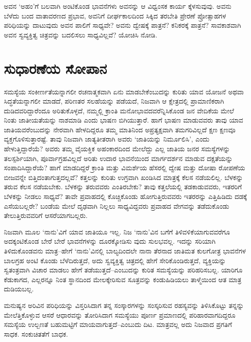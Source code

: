 ಅವನ ‘ಅಹಂ’ಗೆ ಬಲವಾಗಿ ಅಂಟಿಕೊಂಡ ಭಾವನೆಗಳು ಅವನನ್ನು ಆ ವಿಧ್ವಂಸಕ ಕಾರ್ಯ ಕ್ಕೆಳಸುವುವು. ಅವನು ಬೆಳೆದು ಬಂದ ವಾತಾವರಣದ ಪ್ರಭಾವ, ಅವನಿಗೆ ದೀರ್ಘಕಾಲದಿಂದ ಸಿಕ್ಕಿದ ತರಬೇತಿ ಪ್ರೇರಣೆ ಪ್ರೋತ್ಸಾಹಗಳ ಪರಿಧಿಯನ್ನು ದಾಟುವುದು ಅವನ ಪಾಲಿಗೆ ಸಾಧ್ಯವೇ? ಅವನು ದ್ವೇಷಕ್ಕೆ ಪಾತ್ರನೆ? ಕನಿಕರಕ್ಕೆ ಪಾತ್ರನೆ? ಸಾವಕಾಶವಾಗಿ ಅವನ ಸ್ವವ್ಯಕ್ತಿತ್ವ ಚಿತ್ರವನ್ನು ಬದಲಿಸಲು ಸಾಧ್ಯವಿಲ್ಲವೆ? ಯೋಚಿಸಿ ನೋಡಿ.


\section*{ಸುಧಾರಣೆಯ ಸೋಪಾನ}


ಸಮಸ್ಯೆಯ ಸಂಕೀರ್ಣತೆಯನ್ನಾಗಲೀ ರಚನಾತ್ಮಕವಾಗಿ ಏನು ಮಾಡಬೇಕೆಂಬುದನ್ನು ಕುರಿತು ಯಾವ ಯೋಜನೆ ಅಥವಾ ಸಿದ್ಧತೆಯನ್ನಾಗಲೀ ಮಾಡದೆ, ಪರಿಣತರ ಸಲಹೆಯನ್ನು ಪಡೆಯದೆ, ನಿಜವಾಗಿ ಆ ಕ್ಷೇತ್ರದಲ್ಲಿ ಪ್ರಾಮಾಣಿಕರಾಗಿ ದುಡಿದವರಿದ್ದಾರೆಂದೂ ಅರಿತುಕೊಳ್ಳದೆ, ನಮ್ಮಲ್ಲಿ ಕ್ರಾಂತಿ ಮನೋಭಾವದವರೆನ್ನಿಸಿಕೊಂಡ ಜನ ವೇದಿಕೆಯ ಮೇಲೆ ನಿಂತು ಜಾತೀಯತೆಯನ್ನು ನಾಶಮಾಡಿ ಎಂದು ಭಾಷಣ ಬಿಗಿಯುತ್ತಾರೆ. ಹಾಗೆ ಭಾಷಣ ಮಾಡುವವರು ತಾವು ಯಾವ ಜಾತಿಯವರೆಂಬುದನ್ನು ನೇರವಾಗಿ ಹೇಳದಿದ್ದರೂ ತಮ್ಮ ಮಾತಿನಿಂದ ಅಪ್ರತ್ಯಕ್ಷವಾಗಿ ತಮಗರಿ\-ವಿಲ್ಲದೆ ಕ್ಷಣ ಕ್ಷಣವೂ ವ್ಯಕ್ತಗೊಳಿಸುತ್ತಾರಷ್ಟೆ. ತಾವು ನಿಜವಾಗಿ ಜಾತ್ಯತೀತರಾಗಿ ಅವರು ‘ಜಾತಿಯನ್ನು ನಿರ್ಮೂಲಿಸಿ’, ಎಂದು ಹೇಳುತ್ತಿದ್ದಾರೆಯೆ? ಅವರು ತಮ್ಮ ವೈಯಕ್ತಿಕ ಅಹಂಕಾರದಿಂದ ಮೇಲೆದ್ದು ಎಲ್ಲ ಜಾತಿಯ ಜನರ ಸಮಸ್ಯೆಗಳನ್ನು ತಲಸ್ಪರ್ಶಿಯಾಗಿ, ಪೂರ್ವಾಗ್ರಹವಿಲ್ಲದೆ ಅರಿತು ಉದಾರ ಭಾವನೆಯಿಂದ ಮಾರ್ಗದರ್ಶನ ಮಾಡುವ ದಕ್ಷತೆಯನ್ನು ಸಂಪಾದಿಸಿದ್ದಾರೆಯೆ? ಹಾಗೆ ಮಾಡದಿದ್ದರೆ ಕ್ರಾಂತಿ ಮತ್ತು ವಿಮರ್ಶೆಯ ಹೆಸರಲ್ಲಿ ದ್ವೇಷ ಮತ್ತು ದೋಷಾ ರೋಪಣೆಯ ಬೀಜವನ್ನೇ ಬಿತ್ತಿದಂತಾಗುತ್ತದಲ್ಲವೆ? ಕತ್ತಲನ್ನು ಕುರಿತು ಉಗ್ರವಾಗಿ ಖಂಡಿಸಿದ ಮಾತ್ರಕ್ಕೆ ಕೆಲಸ ನಡೆಯಲಿಲ್ಲ. ಬೆಳಕನ್ನು ತರುವ ಕೆಲಸ ನಡೆಯಬೇಕು. ಬೆಳಕನ್ನು ತರುವವರು ಎಂತಿರಬೇಕು? ತಾವು ಕತ್ತಲೆಯಲ್ಲಿ ತಡಕಾಡುವವರು, ಇತರರಿಗೆ ಬೆಳಕನ್ನು ನೀಡಲು ಸಾಧ್ಯವೆ? ತಾವೇ ಪ್ರವಾಹದಲ್ಲಿ ಕೊಚ್ಚಿಕೊಂಡು ಹೋಗುತ್ತಿರುವವರು ಇತರರನ್ನು ಎತ್ತಿಹಿಡಿದು ದಡಕ್ಕೆ ಎಸೆಯಬಲ್ಲರೇ? ಬಂಡೆಯ ಮೇಲೆ ದೃಢವಾಗಿ ನಿಲ್ಲಲು ಸಾಧ್ಯವಿದ್ದವರು ಪ್ರವಾಹದ ವೇಗವನ್ನು ತಡೆದುಕೊಂಡು ತೇಲುತ್ತಿರುವವರಿಗೆ ಆಸರೆಯಾಗಬಲ್ಲರು.

ನಿಜವಾಗಿ ಮೂಲ ‘ನಾನು’ವಿಗೆ ಯಾವ ಜಾತಿಯೂ ಇಲ್ಲ. ನಿಜ ‘ನಾನು’ವಿನ ಬಗೆಗೆ ತಿಳಿವಳಿಕೆಯಾಗುವವರೆಗೂ ಅದಕ್ಕಂಟಿಕೊಂಡ ಬೇರೆ ಬೇರೆ ಭಾವನೆಗಳನ್ನು ದೂರಕ್ಕೋಡಿಸು ವುದು ಸುಲಭವಲ್ಲ. ಇದನ್ನು ಸರಿಯಾಗಿ ತಿಳಿದುಕೊಂಡವನು ಮಾತ್ರ–ಹೇಗೆ ‘ನಾನು’ವಿನಲ್ಲಿ ಬಾಲ್ಯ\-ದಿಂದಲೇ ನಾನಾ ತೆರನಾದ ಜಾತಿಮತ ಕುಲಗೋತ್ರ ಭಾವನೆಗಳ ಬಾಲಗ್ರಹ ಅಂಟಿ ಕೊಂಡು ಬೆಳೆದಿರುತ್ತದೆ, ಅದು ಸ್ವವ್ಯಕ್ತಿತ್ವ ಚಿತ್ರದಲ್ಲಿ ಹೇಗೆ ಸೇರಿಕೊಂಡಿರುತ್ತದೆ, ವ್ಯಕ್ತಿಯನ್ನು ಸ್ವತಂತ್ರವಾಗಿ ವಿಚಾರ ಮಾಡಲು ಹೇಗೆ ತಡೆಯುತ್ತದೆ–ಎಂಬುದನ್ನು ಕುರಿತ ಸಮಸ್ಯೆಯನ್ನು ಪರಿಹರಿಸಬಲ್ಲ. ಯಾರಿಗೂ ಕೆಡುಕಾಗದ, ಎಲ್ಲರನ್ನೂ ನಿಂತ ಸ್ಥಾನದಿಂದ ಮೇಲಕ್ಕೇರಿಸುವ ಸೂತ್ರವನ್ನು ಕಂಡು\-ಹಿಡಿಯಲು ತಾಳ್ಮೆಯಿಂದ ಆತ ಮಾತ್ರ ದುಡಿಯಬಲ್ಲ.

ಮನುಷ್ಯನ ಅರಿವಿನ ಪರಿಧಿಯನ್ನು ವಿಸ್ತರಿಸಿದಾಗ ತನ್ನ ಸಂಸ್ಕಾರಗಳನ್ನು ಸಂಸ್ಕರಿಸುವ ರಹಸ್ಯವನ್ನು ತಿಳಿಸಿಕೊಟ್ಟು ತನ್ನನ್ನು ಮೇಲೆತ್ತಿಕೊಳ್ಳುವ ಆಸರೆ ಆಧಾರವನ್ನು ತೋರಿಸಿದಾಗ ಸಮಸ್ಯೆಯು ಪೂರ್ಣ ಪ್ರಮಾಣದಲ್ಲಿ ಪರಿಹಾರವಾಗದಿದ್ದರೂ ಸಮಸ್ಯೆಯ ಉಲ್ಬಣತೆ ಬಹು\-ಮಟ್ಟಿಗೆ ಮಾಯ\-ವಾಗುತ್ತದೆ–ಎಂಬುದು ದಿಟ. ಮಾತ್ರವಲ್ಲ ಅದು ನಿಜವಾದ ಪ್ರಗತಿಗೆ ಸಾಧಕ. ಸಂಕುಚಿತತೆಗೆ ಬಾಧಕ.


